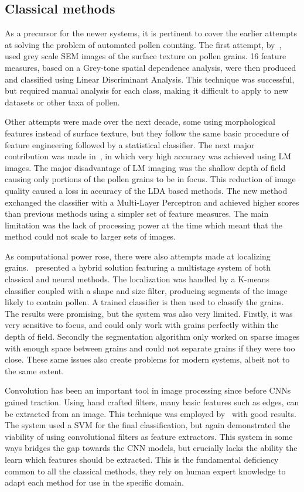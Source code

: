 \subsection{Classical methods}
As a precursor for the newer systems, it is pertinent to cover the earlier attempts at solving the problem of automated pollen counting.
The first attempt, by~\cite{langford_computerized_1990}, used grey scale SEM images of the surface texture on pollen grains. 16 feature measures, based on a Grey-tone spatial dependence analysis, were then produced and classified using Linear Discriminant Analysis.
This technique was successful, but required manual analysis for each class, making it difficult to apply to new datasets or other taxa of pollen.

Other attempts were made over the next decade, some using morphological features instead of surface texture, but they follow the same basic procedure of feature engineering followed by a statistical classifier.
The next major contribution was made in~\cite{li_pollen_1999}, in which very high accuracy was achieved using LM images.
The major disadvantage of LM imaging was the shallow depth of field causing only portions of the pollen grains to be in focus.
This reduction of image quality caused a loss in accuracy of the LDA based methods.
The new method exchanged the classifier with a Multi-Layer Perceptron and achieved higher scores than previous methods using a simpler set of feature measures.
The main limitation was the lack of processing power at the time which meant that the method could not scale to larger sets of images.

As computational power rose, there were also attempts made at localizing grains.\ \cite{france_new_2000} presented a hybrid solution featuring a multistage system of both classical and neural methods.
The localization was handled by a K-means classifier coupled with a shape and size filter, producing segments of the image likely to contain pollen.
A trained classifier is then used to classify the grains.
The results were promising, but the system was also very limited.
Firstly, it was very sensitive to focus, and could only work with grains perfectly within the depth of field.
Secondly the segmentation algorithm only worked on sparse images with enough space between grains and could not separate grains if they were too close.
These same issues also create problems for modern systems, albeit not to the same extent.

Convolution has been an important tool in image processing since before CNNs gained traction.
Using hand crafted filters, many basic features such as edges, can be extracted from an image.
This technique was employed by\ \cite{DaoodICPR16b} with good results.
The system used a SVM for the final classification, but again demonstrated the viability of using convolutional filters as feature extractors.
This system in some ways bridges the gap towards the CNN models, but crucially lacks the ability the learn which features should be extracted.
This is the fundamental deficiency common to all the classical methods, they rely on human expert knowledge to adapt each method for use in the specific domain.

